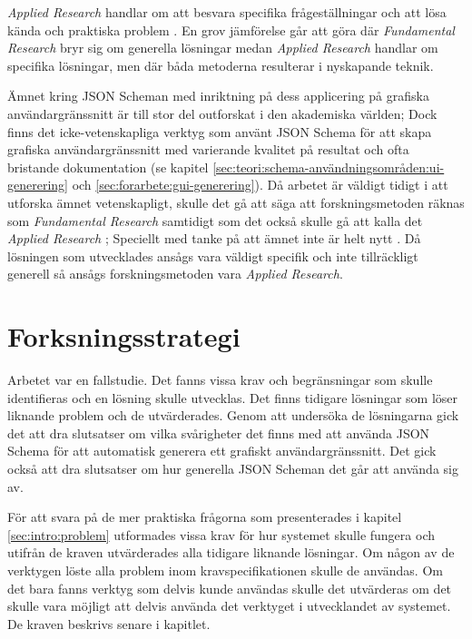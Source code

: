 \textit{Applied Research} handlar om att besvara specifika frågeställningar och att lösa kända och praktiska problem \cite{Hakansson}. En grov jämförelse går att göra där \textit{Fundamental Research} bryr sig om generella lösningar medan \textit{Applied Research} handlar om specifika lösningar, men där båda metoderna resulterar i nyskapande teknik.

Ämnet kring JSON Scheman med inriktning på dess applicering på grafiska användargränssnitt är till stor del outforskat i den akademiska världen; Dock finns det icke-vetenskapliga verktyg som använt JSON Schema för att skapa grafiska användargränssnitt med varierande kvalitet på resultat och ofta bristande dokumentation (se kapitel \ref{sec:teori:schema-användningsområden:ui-generering} och \ref{sec:forarbete:gui-generering}). Då arbetet är väldigt tidigt i att utforska ämnet vetenskapligt, skulle det gå att säga att forskningsmetoden räknas som \textit{Fundamental Research} samtidigt som det också skulle gå att kalla det \textit{Applied Research} \cite{Hakansson}; Speciellt med tanke på att ämnet inte är helt nytt \cite{Hakansson}. Då lösningen som utvecklades ansågs vara väldigt specifik och inte tillräckligt generell så ansågs forskningsmetoden vara \textit{Applied Research}.

\section{Forksningsstrategi}
\label{sec:metod:forskningsstrategi}
Arbetet var en fallstudie. Det fanns vissa krav och begränsningar som skulle identifieras och en lösning skulle utvecklas. Det finns tidigare lösningar som löser liknande problem och de utvärderades. Genom att undersöka de lösningarna gick det att dra slutsatser om vilka svårigheter det finns med att använda JSON Schema för att automatisk generera ett grafiskt användargränssnitt. Det gick också att dra slutsatser om hur generella JSON Scheman det går att använda sig av.

För att svara på de mer praktiska frågorna som presenterades i kapitel \ref{sec:intro:problem} utformades vissa krav för hur systemet skulle fungera och utifrån de kraven utvärderades alla tidigare liknande lösningar. Om någon av de verktygen löste alla problem inom kravspecifikationen skulle de användas. Om det bara fanns verktyg som delvis kunde användas skulle det utvärderas om det skulle vara möjligt att delvis använda det verktyget i utvecklandet av systemet. De kraven beskrivs senare i kapitlet.

